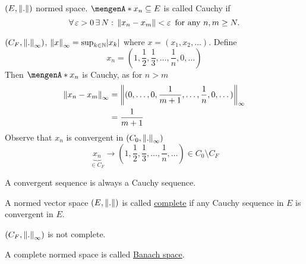 \begin{definition*}
	$(E, \norm{.})$ normed space. $\set{x_n} \subseteq E$ is called Cauchy if
	\[
		\forall\, \varepsilon >0 \,\exists\,N: \,\norm{x_n-x_m}< \varepsilon \,\text{ for any }n,m \geq N.
	\]
\end{definition*}
\begin{beispiel}
	$(C_F,\norm{.}_{\infty})$, $\norm{x}_{\infty}= \sup_{k \in \mathbb{N}}\abs{x_k}$ where $x = (x_1,x_2,\dots)$. Define
	\[
		x_n = (1, \frac{1}{2}, \frac{1}{3}, \dots, \frac{1}{n}, 0, \dots)
	\]
	Then $\set{x_n}$ is Cauchy, as for $n >m$ 
	\begin{align*}
		\norm{x_n-x_m}_{\infty} &= \norm{(0, \dots,0, \frac{1}{m+1}, \dots, \frac{1}{n},0,\dots)}_{\infty} \\
		&= \frac{1}{m+1}
	\end{align*}
	Observe that $x_n$ is convergent in $(C_0,\norm{.}_{\infty})$
	\[
		\underset{\in C_F}{\underbrace{x_n}} \to (1, \frac{1}{2}, \frac{1}{3}, \dots, \frac{1}{n}, \dots) \in C_0 \setminus C_F
	\]
\end{beispiel}
\begin{satz}
	A convergent sequence is always a Cauchy sequence.
\end{satz}
\begin{definition*}
	A normed vector space $(E, \norm{.})$ is called \underline{complete} if any Cauchy sequence in $E$ is convergent in $E$.
\end{definition*}
$(C_F,\norm{.}_{\infty})$ is not complete.
\begin{definition*}
	A complete normed space is called \underline{Banach space}.
\end{definition*}
